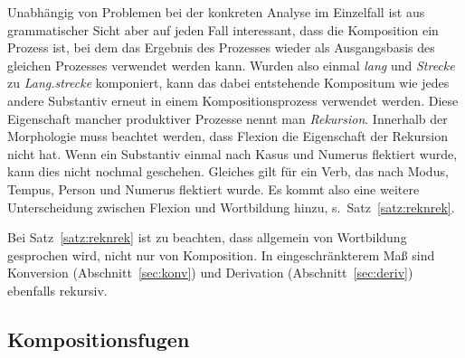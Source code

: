 Unabhängig von Problemen bei der konkreten Analyse im Einzelfall ist aus grammatischer Sicht aber auf jeden Fall interessant, dass die Komposition ein Prozess ist, bei dem das Ergebnis des Prozesses wieder als Ausgangsbasis des gleichen Prozesses verwendet werden kann.
Wurden also einmal \textit{lang} und \textit{Strecke} zu \textit{Lang.strecke} komponiert, kann das dabei entstehende Kompositum wie jedes andere Substantiv erneut in einem Kompositionsprozess verwendet werden.
Diese Eigenschaft mancher produktiver Prozesse nennt man \textit{Rekursion}.
Innerhalb der Morphologie muss beachtet werden, dass Flexion die Eigenschaft der Rekursion nicht hat.
Wenn ein Substantiv einmal nach Kasus und Numerus flektiert wurde, kann dies nicht nochmal geschehen.
Gleiches gilt für ein Verb, das nach Modus, Tempus, Person und Numerus flektiert wurde.
Es kommt also eine weitere Unterscheidung zwischen Flexion und Wortbildung hinzu, s.\ Satz~\ref{satz:reknrek}.


Bei Satz~\ref{satz:reknrek} ist zu beachten, dass allgemein von Wortbildung gesprochen wird, nicht nur von Komposition.
In eingeschränkterem Maß sind Konversion (Abschnitt~\ref{sec:konv}) und Derivation (Abschnitt~\ref{sec:deriv}) ebenfalls rekursiv.

\subsection{Kompositionsfugen}


